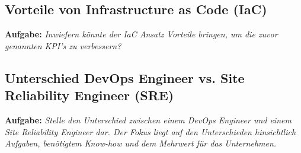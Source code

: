 \subsection{Vorteile von Infrastructure as Code (IaC)}
\textbf{Aufgabe:} \textit{Inwiefern könnte der IaC Ansatz Vorteile bringen, um die zuvor genannten
KPI's zu verbessern?}

\subsection{Unterschied DevOps Engineer vs. Site Reliability Engineer (SRE)}
\textbf{Aufgabe:} \textit{Stelle den Unterschied zwischen einem DevOps Engineer und einem Site
Reliability Engineer dar. Der Fokus liegt auf den Unterschieden hinsichtlich Aufgaben,
benötigtem Know-how und dem Mehrwert für das Unternehmen.}